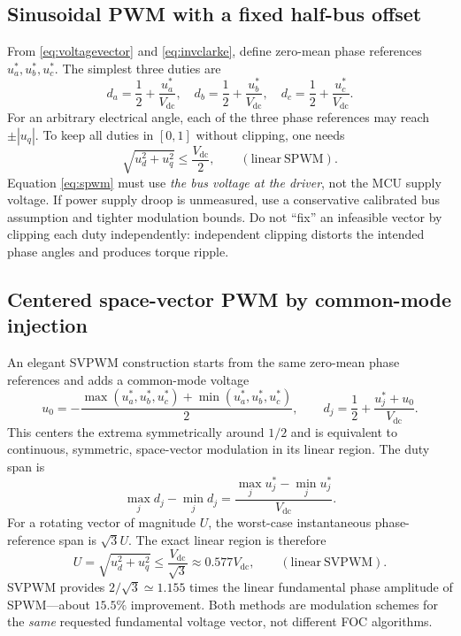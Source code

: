 \documentclass[10pt,letterpaper]{article}
\newcommand{\Vdc}{V_{\mathrm{dc}}}
\begin{document}
\subsection{Sinusoidal PWM with a fixed half-bus offset}
From \eqref{eq:voltagevector} and \eqref{eq:invclarke}, define zero-mean phase references $u_a^*,u_b^*,u_c^*$. The simplest three duties are
\begin{equation}\label{eq:spwm}
d_a=\frac12+\frac{u_a^*}{\Vdc},\quad
d_b=\frac12+\frac{u_b^*}{\Vdc},\quad
d_c=\frac12+\frac{u_c^*}{\Vdc}.
\end{equation}
For an arbitrary electrical angle, each of the three phase references may reach $\pm|u_q|$. To keep all duties in $[0,1]$ without clipping, one needs
\begin{equation}\label{eq:spwmlim}
\sqrt{u_d^2+u_q^2}\le\frac{\Vdc}{2},\qquad (\mathrm{linear\ SPWM}).
\end{equation}
Equation \eqref{eq:spwm} must use \emph{the bus voltage at the driver}, not the MCU supply voltage. If power supply droop is unmeasured, use a conservative calibrated bus assumption and tighter modulation bounds. Do not ``fix'' an infeasible vector by clipping each duty independently: independent clipping distorts the intended phase angles and produces torque ripple.

\subsection{Centered space-vector PWM by common-mode injection}
An elegant SVPWM construction starts from the same zero-mean phase references and adds a common-mode voltage
\begin{equation}\label{eq:svmoffset}
u_0=-\frac{\max(u_a^*,u_b^*,u_c^*)+\min(u_a^*,u_b^*,u_c^*)}{2},\qquad
d_j=\frac12+\frac{u_j^*+u_0}{\Vdc}.
\end{equation}
This centers the extrema symmetrically around $1/2$ and is equivalent to continuous, symmetric, space-vector modulation in its linear region. The duty span is
\begin{equation}
\max_j d_j-\min_j d_j=\frac{\max_j u_j^*-\min_j u_j^*}{\Vdc}.
\end{equation}
For a rotating vector of magnitude $U$, the worst-case instantaneous phase-reference span is $\sqrt3 U$. The exact linear region is therefore
\begin{equation}\label{eq:svmlim}
U=\sqrt{u_d^2+u_q^2}\le\frac{\Vdc}{\sqrt3}\approx0.577\Vdc,\qquad (\mathrm{linear\ SVPWM}).
\end{equation}
SVPWM provides $2/\sqrt3\simeq1.155$ times the linear fundamental phase amplitude of SPWM---about $15.5\%$ improvement. Both methods are modulation schemes for the \emph{same} requested fundamental voltage vector, not different FOC algorithms.
\end{document}
